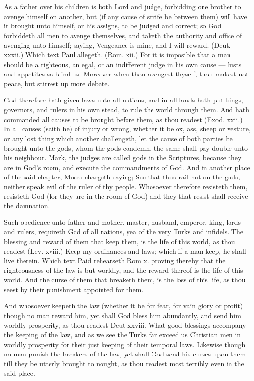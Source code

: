 As a father over his children is both Lord and judge, 
forbidding one brother to avenge himself on another, but
(if any cause of strife be between them) will have it 
brought unto himself, or his assigns, to be judged and 
correct; so God forbiddeth all men to avenge themselves,
and taketh the authority and office of avenging unto 
himself; saying, Vengeance is mine, and I will reward. 
(Deut. xxxii.) Which text Paul allegeth, (Rom. xii.) 
For it is imposible that a man should be a righteous, an 
egal, or an indifferent judge in his own cause — lusts and 
appetites so blind us. Moreover when thou avengest 
thyself, thou makest not peace, but stirrest up more 
debate. 

God therefore hath given laws unto all nations, and in 
all lands hath put kings, governors, and rulers in his own 
stead, to rule the world through them. And hath commanded
all causes to be brought before them, as thou readest 
(Exod. xxii.) In all causes (saith he) of injury or wrong, 
whether it be ox, ass, sheep or vesture, or any lost thing 
which another challengeth, let the cause of both parties be 
brought unto the gods, whom the gods condemn, the 
same shall pay double unto his neighbour. Mark, the 
judges are called gods in the Scriptures, because they are 
in God's room, and execute the commandments of God. 
And in another place of the said chapter, Moses chargeth 
saying; See that thou rail not on the gods, neither speak 
evil of the ruler of thy people. Whosoever therefore resisteth
them, resisteth God (for they are in the room of 
God) and they that resist shall receive the damnation. 

Such obedience unto father and mother, master, 
husband, emperor, king, lords and rulers, requireth God 
of all nations, yea of the very Turks and infidels. The 
blessing and reward of them that keep them, is the life of 
this world, as thou readest (Lev. xviii.) Keep my ordinances
and laws; which if a man keep, he shall live 
therein. Which text Paid rehearseth Rom x. proving 
thereby that the righteousness of the law is but worldly, 
and the reward thereof is the life of this world. And the 
curse of them that breaketh them, is the loss of this life, 
as thou seest by their punishment appointed for them.

And whosoever keepeth the law (whether it be for fear, 
for vain glory or profit) though no man reward him, yet 
shall God bless him abundantly, and send him worldly 
prosperity, as thou readest Deut xxviii. What good 
blessings accompany the keeping of the law, and as we 
see the Turks far exceed us Christian men in worldly prosperity
for their just keeping of their temporal laws. Likewise
though no man punish the breakers of the law, yet 
shall God send his curses upon them till they be utterly 
brought to nought, as thou readest most terribly even in 
the said place.

